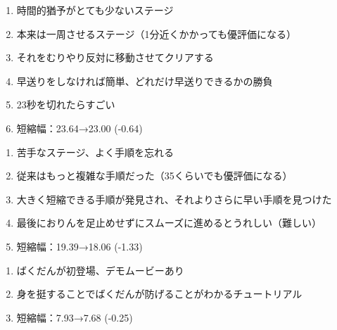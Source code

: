 \begin{enumerate}[label={\sarrow}]
\item 時間的猶予がとても少ないステージ
\item 本来は一周させるステージ（1分近くかかっても優評価になる）
\item それをむりやり反対に移動させてクリアする
\item 早送りをしなければ簡単、どれだけ早送りできるかの勝負
\item 23秒を切れたらすごい
\item 短縮幅：23.64→23.00 (-0.64)
\end{enumerate}



\begin{enumerate}[label={\sarrow}]
\item 苦手なステージ、よく手順を忘れる
\item 従来はもっと複雑な手順だった（35くらいでも優評価になる）
\item 大きく短縮できる手順が発見され、それよりさらに早い手順を見つけた
\item 最後におりんを足止めせずにスムーズに進めるとうれしい（難しい）
\item 短縮幅：19.39→18.06 (-1.33)
\end{enumerate}








\begin{enumerate}[label={\sarrow}]
\item ばくだんが初登場、デモムービーあり
\item 身を挺することでばくだんが防げることがわかるチュートリアル
\item 短縮幅：7.93→7.68 (-0.25)
\end{enumerate}




